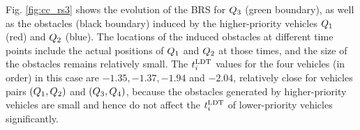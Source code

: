 Fig. \ref{fig:cc_rs3} shows the evolution of the BRS for $Q_3$ (green boundary), as well as the obstacles (black boundary) induced by the higher-priority vehicles $Q_1$ (red) and $Q_2$ (blue). The locations of the induced obstacles at different time points include the actual positions of $Q_1$ and $Q_2$ at those times, and the size of the obstacles remains relatively small. The $t^\text{LDT}_i$ values for the four vehicles (in order) in this case are $-1.35, -1.37, -1.94$ and $-2.04$, relatively close for vehicles pairs $(Q_1, Q_2)$ and $(Q_3, Q_4)$, because the obstacles generated by higher-priority vehicles are small and hence do not affect the $t^\text{LDT}_i$ of lower-priority vehicles significantly.